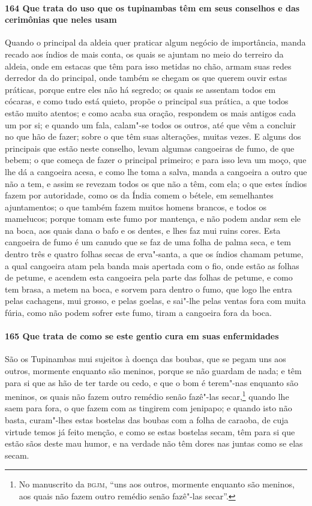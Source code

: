\begin{linenumbers}
\paragraph{164 Que trata do uso que os tupinambas têm em seus conselhos e das cerimônias
que neles usam}\quad
Quando o principal da aldeia quer praticar algum negócio de importância, manda recado aos
índios de mais conta, os quais se ajuntam no meio do terreiro da aldeia, onde em estacas
que têm para isso metidas no chão, armam suas redes derredor da do principal, onde também
se chegam os que querem ouvir estas práticas, porque entre eles não há segredo; os quais
se assentam todos em cócaras, e como tudo está quieto, propõe o principal sua prática, a
que todos estão muito atentos; e como acaba sua oração, respondem os mais antigos cada um
por si; e quando um fala, calam"-se todos os outros, até que vêm a concluir no que hão de
fazer; sobre o que têm suas alterações, muitas vezes. E alguns dos principais que estão
neste conselho, levam algumas cangoeiras de fumo, de que bebem; o que começa de fazer o
principal primeiro; e para isso leva um moço, que lhe dá a cangoeira acesa, e como lhe
toma a salva, manda a cangoeira a outro que não a tem, e assim se revezam todos os que não
a têm, com ela; o que estes índios fazem por autoridade, como os da Índia comem o bétele,
em semelhantes ajuntamentos; o que também fazem muitos homens brancos, e todos os
mamelucos; porque tomam este fumo por mantença, e não podem andar sem ele na boca, aos
quais dana o bafo e os dentes, e lhes faz mui ruins cores. Esta cangoeira de fumo é um
canudo que se faz de uma folha de palma seca, e tem dentro três e quatro folhas secas de
erva"-santa, a que os índios chamam petume, a qual cangoeira atam pela banda mais apertada
com o fio, onde estão as folhas de petume, e acendem esta cangoeira pela parte das folhas
de petume, e como tem brasa, a metem na boca, e sorvem para dentro o fumo, que logo lhe
entra pelas cachagens, mui grosso, e pelas goelas, e sai"-lhe pelas ventas fora com muita
fúria, como não podem sofrer este fumo, tiram a cangoeira fora da boca.

\paragraph{165 Que trata de como se este gentio cura em suas \mbox{enfermidades}}\quad
São os Tupinambas mui sujeitos à doença das boubas, que se pegam uns aos outros, mormente
enquanto são meninos, porque se não guardam de nada; e têm para si que as hão de ter tarde
ou cedo, e que o bom é terem"-nas enquanto são meninos, os quais não fazem outro remédio
senão fazê"-las secar,\footnote{ No manuscrito da \textsc{bgjm}, ``uns aos outros, mormente
enquanto são meninos, aos quais não fazem outro remédio senão fazê"-las secar''.} quando
lhe saem para fora, o que fazem com as tingirem com jenipapo; e quando isto não basta,
curam"-lhes estas bostelas das boubas com a folha de caraoba, de cuja virtude temos já
feito menção, e como se estas bostelas secam, têm para si que estão sãos deste mau humor,
e na verdade não têm dores nas juntas como se elas secam.


\end{linenumbers}
